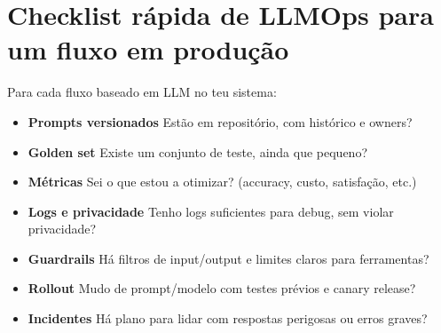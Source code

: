 \section{Checklist rápida de LLMOps para um fluxo em produção}

Para cada fluxo baseado em LLM no teu sistema:

\begin{itemize}[leftmargin=*]
\item \textbf{Prompts versionados}
Estão em repositório, com histórico e owners?
\item \textbf{Golden set}
Existe um conjunto de teste, ainda que pequeno?
\item \textbf{Métricas}
Sei o que estou a otimizar? (accuracy, custo, satisfação, etc.)
\item \textbf{Logs e privacidade}
Tenho logs suficientes para debug, sem violar privacidade?
\item \textbf{Guardrails}
Há filtros de input/output e limites claros para ferramentas?
\item \textbf{Rollout}
Mudo de prompt/modelo com testes prévios e canary release?
\item \textbf{Incidentes}
Há plano para lidar com respostas perigosas ou erros graves?
\end{itemize}

